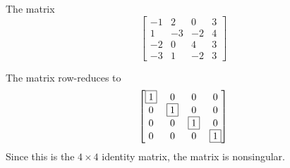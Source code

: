 \documentclass{ximera}
\begin{document}
\begin{exercise}
  The matrix
  \[
    \begin{bmatrix}
      -1 & 2 & 0 & 3 \\
      1 & -3 & -2 & 4 \\
      -2 & 0 & 4 & 3 \\
      -3 & 1 & -2 & 3
    \end{bmatrix}
  \]
  \begin{multipleChoice}
  \end{multipleChoice}

  \begin{feedback}[correct]
    The matrix row-reduces to
    \[
      \begin{bmatrix}
        \fbox{1} & 0 & 0 & 0 \\
        0 & \fbox{1} & 0 & 0 \\
        0 & 0 & \fbox{1} & 0 \\
        0 & 0 & 0 & \fbox{1}
      \end{bmatrix}
    \]
    Since this is the $4\times 4$ identity matrix, the matrix is nonsingular.
  \end{feedback}
\end{exercise}
\end{document}
